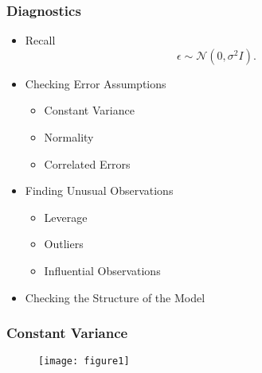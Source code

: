 \documentclass[serif,mathserif,professionalfont]{beamer}
\begin{document}
\begin{frame}
	
	\frametitle{Diagnostics}
	
	\begin{itemize}
		\item Recall
		$$ \epsilon \sim \mathcal{N} \left(0, \sigma^2 I \right). $$
		\item Checking Error Assumptions
		\begin{itemize}
			\item Constant Variance
			\item Normality
			\item Correlated Errors
		\end{itemize}
		\item Finding Unusual Observations
		\begin{itemize}
			\item Leverage
			\item Outliers
			\item Influential Observations
		\end{itemize}
		\item Checking the Structure of the Model
	\end{itemize}
	
	
\end{frame}




\begin{frame}
	
	\frametitle{Constant Variance}
	
    	\begin{figure}
    		\texttt{[image: figure1]}
    	\end{figure}
	
    	\vspace{0.5cm}
    	
	
	
\end{frame}



%	
%	
%	
\end{document}
